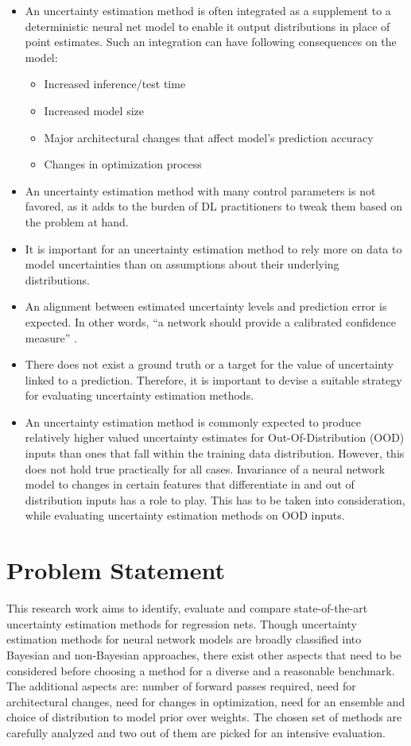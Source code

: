     \begin{itemize}
    	\item An uncertainty estimation method is often integrated as a supplement to a deterministic neural net model to enable it output distributions in place of point estimates. Such an integration can have following consequences on the model:
    	\begin{itemize}
		\item Increased inference/test time
		\item Increased model size
		\item Major architectural changes that affect model's prediction accuracy
		\item Changes in optimization process
    	\end{itemize}
    	\item An uncertainty estimation method with many control parameters is not favored, as it adds to the burden of DL practitioners to tweak them based on the problem at hand.
    	\item It is important for an uncertainty estimation method to rely more on data to model uncertainties than on assumptions about their underlying distributions.
    	\item An alignment between estimated uncertainty levels and prediction error is expected. In other words, \enquote{a network should provide a calibrated confidence measure} \cite{guo2017on}.
    	\item There does not exist a ground truth or a target for the value of uncertainty linked to a prediction. Therefore, it is important to devise a suitable strategy for evaluating uncertainty estimation methods.
    	\item An uncertainty estimation method is commonly expected to produce relatively higher valued uncertainty estimates for Out-Of-Distribution (OOD) inputs than ones that fall within the training data distribution. However, this does not hold true practically for all cases. Invariance of a neural network model to changes in certain features that differentiate in and out of distribution inputs has a role to play. This has to be taken into consideration, while evaluating uncertainty estimation methods on OOD inputs.
        \end{itemize}

    \section{Problem Statement}
    This research work aims to identify, evaluate and compare state-of-the-art uncertainty estimation methods for regression nets. Though uncertainty estimation methods for neural network models are broadly classified into Bayesian and non-Bayesian approaches, there exist other aspects that need to be considered before choosing a method for a diverse and a reasonable benchmark. The additional aspects are: number of forward passes required, need for architectural changes, need for changes in optimization, need for an ensemble and choice of distribution to model prior over weights. The chosen set of methods are carefully analyzed and two out of them are picked for an intensive evaluation.
    
